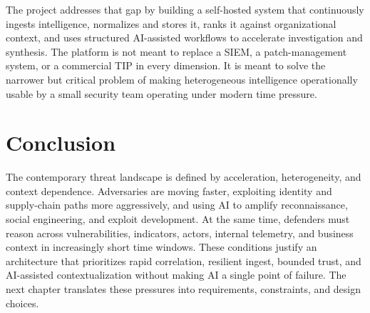 The project addresses that gap by building a self-hosted system that continuously ingests intelligence, normalizes and stores it, ranks it against organizational context, and uses structured AI-assisted workflows to accelerate investigation and synthesis. The platform is not meant to replace a SIEM, a patch-management system, or a commercial TIP in every dimension. It is meant to solve the narrower but critical problem of making heterogeneous intelligence operationally usable by a small security team operating under modern time pressure.

\section*{Conclusion}
The contemporary threat landscape is defined by acceleration, heterogeneity, and context dependence. Adversaries are moving faster, exploiting identity and supply-chain paths more aggressively, and using AI to amplify reconnaissance, social engineering, and exploit development. At the same time, defenders must reason across vulnerabilities, indicators, actors, internal telemetry, and business context in increasingly short time windows. These conditions justify an architecture that prioritizes rapid correlation, resilient ingest, bounded trust, and AI-assisted contextualization without making AI a single point of failure. The next chapter translates these pressures into requirements, constraints, and design choices.
